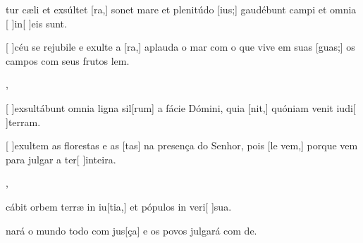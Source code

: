 {    {\item {}tur cæli et exsúltet [ra,] sonet mare et plenitúdo [ius;] gaudébunt campi et omnia [ ]{in}[ ]{e}is sunt.}%
        {\item {}[ ]{céu} se rejubile e exulte a [ra,] aplauda o mar com o que vive em suas [guas;] os campos com seus frutos lem.},
    {\item {}[ ]{ex}sultábunt omnia ligna sil[rum] a fácie Dómini, quia [nit,] quóniam venit iudi[ ]{ter}ram.}%
        {\item {}[ ]{e}xultem as florestas e as [tas] na presença do Senhor, pois [le vem,] porque vem para julgar a ter[ ]{in}{tei}ra.},
    {\item {}cábit orbem terræ in iu[tia,] et pópulos in veri[ ]{su}a.}%
        {\item {}nará o mundo todo com jus[ça] e os povos julgará com de.}
}